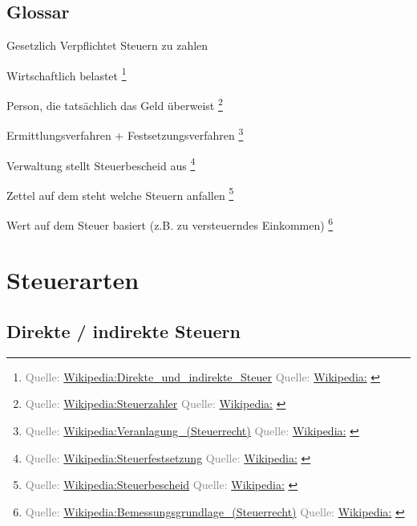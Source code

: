 \documentclass{beamer}
\let\oldfootnote\footnote
\renewcommand{\footnote}[1]
{%
	\oldfootnote
	{
		\tiny
		\textcolor{gray}{#1}
	}%
}
\newcommand{\citewiki}[2][]
{%
	\footnote
	{
		\ifthenelse{\isempty{#1}}
		{
			Quelle: \href{https://de.wikipedia.org/wiki/#2}{Wikipedia:#2}
		}
		{
			Quelle: \href{https://de.wikipedia.org/wiki/#2}{Wikipedia:#1}
		}
	}
}
\begin{document}
		\begin{frame}
		\end{frame}
		
		\subsection{Glossar}
		
			\begin{frame}
				\begin{description}[labelwidth=0cm]
					\item[Steuerschuldner] Gesetzlich Verpflichtet Steuern zu zahlen
					\item[Steuerträger] Wirtschaftlich belastet\citewiki{Direkte\_und\_indirekte\_Steuer}
					\item[Steuerzahler] Person, die tatsächlich das Geld überweist\citewiki{Steuerzahler}
					\item[Veranlagung] Ermittlungsverfahren + Festsetzungsverfahren\citewiki{Veranlagung\_(Steuerrecht)}
					\item[Steuerfestsetzung] Verwaltung stellt Steuerbescheid aus\citewiki{Steuerfestsetzung}
					\item[Steuerbescheid] Zettel auf dem steht welche Steuern anfallen\citewiki{Steuerbescheid}
					\item[Bemessungsgrundlage] Wert auf dem Steuer basiert (z.B. zu versteuerndes Einkommen)\citewiki{Bemessungsgrundlage\_(Steuerrecht)}
				\end{description}
			\end{frame}
	
	\section{Steuerarten}
	
		\begin{frame}
		\end{frame}
	
		\subsection{Direkte / indirekte Steuern}
		
\end{document}
